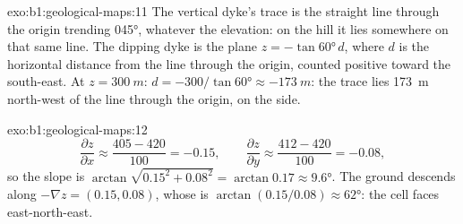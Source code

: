 \begin{solution}{exo:b1:geological-maps:11}
The vertical dyke's trace is the straight line through the origin trending
\ang{045}, whatever the elevation: on the hill it lies somewhere on that same
line. The dipping dyke is the plane $z = -\tan\ang{60}\,d$, where $d$ is the
horizontal distance from the  line through the origin, counted
positive toward the south-east. At $z = \qty{300}{m}$: $d = -300/\tan\ang{60}
\approx \qty{-173}{m}$: the trace lies \qty{173}{m} north-west of the
 line through the origin, on the  side.
\end{solution}

\begin{solution}{exo:b1:geological-maps:12}
\[
  \frac{\partial z}{\partial x} \approx \frac{405 - 420}{100} = -0.15, \qquad
  \frac{\partial z}{\partial y} \approx \frac{412 - 420}{100} = -0.08,
\]
so the slope is $\arctan\sqrt{0.15^2 + 0.08^2} = \arctan 0.17 \approx
\ang{9.6}$. The ground
descends along $-\nabla z = (0.15, 0.08)$, whose  is
$\arctan(0.15/0.08) \approx \ang{62}$: the cell faces east-north-east.
\end{solution}

